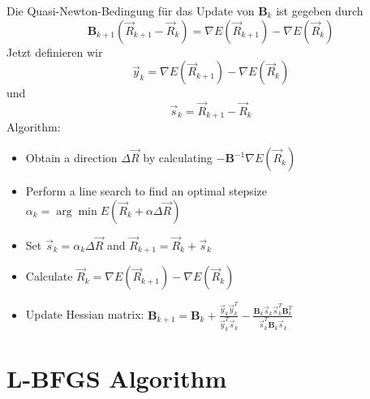 \documentclass[9pt]{report}
\begin{document}
Die Quasi-Newton-Bedingung für das Update von $\boldsymbol{B}_k$ ist gegeben durch
\begin{equation}
\boldsymbol{B}_{k+1}(\vec{R}_{k+1}-\vec{R}_k) = \nabla E(\vec{R}_{k+1})-\nabla E(\vec{R}_k)
\end{equation}
Jetzt definieren wir
\begin{equation}
\vec{y}_k = \nabla E(\vec{R}_{k+1})-\nabla E(\vec{R}_k)
\end{equation}
und
\begin{equation}
\vec{s}_k = \vec{R}_{k+1} - \vec{R}_{k}
\end{equation}
Algorithm:
\begin{itemize}
	\item Obtain a direction $\Delta\vec{R}$ by calculating $-\boldsymbol{B}^{-1}\nabla E(\vec{R}_k)$
	\item Perform a line search to find an optimal stepsize $\alpha_k = \arg\min E(\vec{R}_{k}+\alpha\Delta\vec{R})$
	\item Set $\vec{s}_k = \alpha_k\Delta\vec{R}$ and $\vec{R}_{k+1}=\vec{R}_k+\vec{s}_k$
	\item Calculate $\vec{R}_k = \nabla E(\vec{R}_{k+1}) - \nabla E(\vec{R}_k)$
	\item Update Hessian matrix: $\boldsymbol{B}_{k+1}=\boldsymbol{B}_{k}+\frac{\vec{y}_k\vec{y}_k^{T}}{\vec{y}_k^{T}\vec{s}_k} - \frac{\boldsymbol{B}_k\vec{s}_k\vec{s}_k^{T}\boldsymbol{B}_k^{T}}{\vec{s}_{k}^{T}\boldsymbol{B}_k\vec{s}_k}$
\end{itemize}






\section{L-BFGS Algorithm}































\newpage
\end{document}
